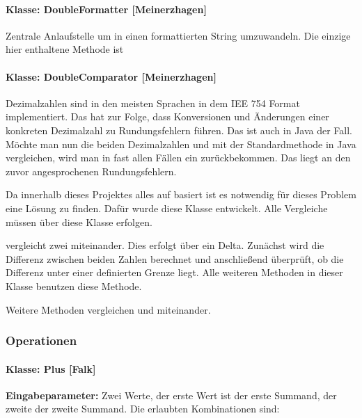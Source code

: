\paragraph{Klasse: DoubleFormatter [Meinerzhagen]}

Zentrale Anlaufstelle um  in einen formattierten String umzuwandeln. Die einzige hier enthaltene Methode ist 


\paragraph{Klasse: DoubleComparator [Meinerzhagen]}

Dezimalzahlen sind in den meisten Sprachen in dem IEE 754 Format implementiert. Das hat zur Folge, dass Konversionen und Änderungen einer konkreten Dezimalzahl zu Rundungsfehlern führen. Das ist auch in Java der Fall. Möchte man nun die beiden Dezimalzahlen  und  mit der Standardmethode in Java vergleichen, wird man in fast allen Fällen ein  zurückbekommen. Das liegt an den zuvor angesprochenen Rundungsfehlern. 

Da innerhalb dieses Projektes alles auf  basiert ist es notwendig für dieses Problem eine Lösung zu finden. Dafür wurde diese Klasse entwickelt. Alle Vergleiche müssen über diese Klasse erfolgen.

 vergleicht zwei  miteinander. Dies erfolgt über ein Delta. Zunächst wird die Differenz zwischen beiden Zahlen berechnet und anschließend überprüft, ob die Differenz unter einer definierten Grenze liegt. Alle weiteren Methoden in dieser Klasse benutzen diese Methode.

Weitere Methoden vergleichen  und  miteinander.

\subsubsection{Operationen}

\paragraph{Klasse: Plus [Falk]}

\textbf{Eingabeparameter: }Zwei Werte, der erste Wert ist der erste Summand, der zweite der zweite Summand. Die erlaubten Kombinationen sind: 

